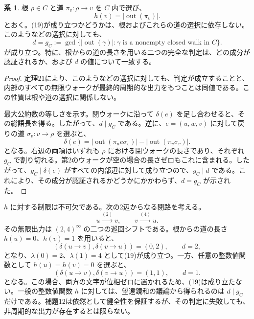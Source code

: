 \documentclass[11pt,reqno]{amsart}
\theoremstyle{definition}
\newtheorem{corollary}[theorem]{系}
\theoremstyle{definition}
\theoremstyle{remark}
\begin{document}
\begin{samepage}
\begin{corollary}\leavevmode\label{thm:22}
根 \(\rho\in C\) と道 \(\pi_v:\rho\to v\) を \(C\) 内で選び、
\[
h(v)=|\operatorname{out}(\pi_v)|.
\]
とおく。(19)が成り立つかどうかは、根およびこれらの道の選択に依存しない。このようなどの選択に対しても、
\[
d=g_C:=\gcd\bigl\{|\operatorname{out}(\gamma)|:
\gamma\text{ is a nonempty closed walk in }C\bigr\}.
\]
が成り立つ。特に、根からの道の長さを用いる二つの完全な判定は、どの成分が認証されるか、および \(d\) の値について一致する。
\label{thm-end:22}
\end{corollary}
\end{samepage}

\begin{proof}\leavevmode\label{proof:22}
定理21により、このようなどの選択に対しても、判定が成立することと、内部のすべての無限ウォークが最終的周期的な出力をもつことは同値である。この性質は根や道の選択に関係しない。

最大公約数の等しさを示す。閉ウォークに沿って \(\delta(e)\) を足し合わせると、その総語長を得る。したがって、\(d\mid g_C\) である。逆に、\(e=(u,w,v)\) に対して戻りの道 \(\sigma_v:v\to\rho\) を選ぶと、
\[
\delta(e)
=|\operatorname{out}(\pi_u e\sigma_v)|
 -|\operatorname{out}(\pi_v\sigma_v)|.
\]
となる。右辺の両項はいずれも \(\rho\) における閉ウォークの長さであり、それぞれ \(g_C\) で割り切れる。第2のウォークが空の場合の長さゼロもこれに含まれる。したがって、\(g_C\mid\delta(e)\) がすべての内部辺に対して成り立つので、\(g_C\mid d\) である。これにより、その成分が認証されるかどうかにかかわらず、\(d=g_C\) が示された。\qedhere
\end{proof}

\(h\) に対する制限は不可欠である。次の2辺からなる閉路を考える。
\[
u\xrightarrow{(2)}v,\qquad v\xrightarrow{(4)}u.
\]
その無限出力は \((2,4)^\infty\) の二つの巡回シフトである。根からの道の長さ \(h(u)=0\)、\(h(v)=1\) を用いると、
\[
(\delta(u\to v),\delta(v\to u))=(0,2),\qquad d=2,
\]
となり、\(\lambda(0)=2\)、\(\lambda(1)=4\) として(19)が成り立つ。一方、任意の整数値関数として \(h(u)=h(v)=0\) を選ぶと、
\[
(\delta(u\to v),\delta(v\to u))=(1,1),\qquad d=1.
\]
となる。この場合、両方の文字が位相ゼロに置かれるため、(19)は成り立たない。一般の整数値関数 \(h\) に対しては、望遠鏡和の議論から得られるのは \(d\mid g_C\) だけである。補題12は依然として健全性を保証するが、その判定に失敗しても、非周期的な出力が存在するとは限らない。
\end{document}
